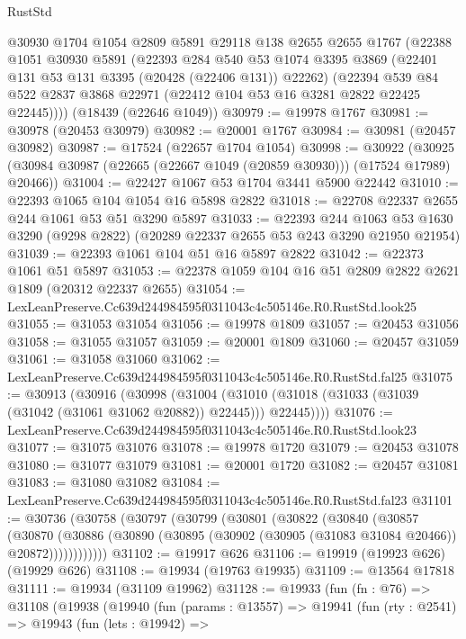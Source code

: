\begin{lexlean}{RustStd}
\begin{coremodule}
    @30930
    @1704
    @1054
    @2809
    @5891
    @29118
    @138
    @2655
    @2655
    @1767
    (@22388
      @1051
      @30930
      @5891
      (@22393
        @284
        @540
        @53
        @1074
        @3395
        @3869
        (@22401 @131 @53 @131 @3395 (@20428 (@22406 @131)) @22262)
        (@22394 @539 @84 @522 @2837 @3868 @22971 (@22412 @104 @53 @16 @3281 @2822 @22425 @22445))))
    (@18439 (@22646 @1049))
@30979 := @19978 @1767
@30981 := @30978 (@20453 @30979)
@30982 := @20001 @1767
@30984 := @30981 (@20457 @30982)
@30987 := @17524 (@22657 @1704 @1054)
@30998 := @30922
    (@30925 (@30984 @30987 (@22665 (@22667 @1049 (@20859 @30930))) (@17524 @17989) @20466))
@31004 := @22427 @1067 @53 @1704 @3441 @5900 @22442
@31010 := @22393 @1065 @104 @1054 @16 @5898 @2822
@31018 := @22708 @22337 @2655 @244 @1061 @53 @51 @3290 @5897
@31033 := @22393
    @244
    @1063
    @53
    @1630
    @3290
    (@9298 @2822)
    (@20289 @22337 @2655 @53 @243 @3290 @21950 @21954)
@31039 := @22393 @1061 @104 @51 @16 @5897 @2822
@31042 := @22373 @1061 @51 @5897
@31053 := @22378 @1059 @104 @16 @51 @2809 @2822 @2621 @1809 (@20312 @22337 @2655)
@31054 := LexLeanPreserve.Cc639d244984595f0311043c4c505146e.R0.RustStd.look25
@31055 := @31053 @31054
@31056 := @19978 @1809
@31057 := @20453 @31056
@31058 := @31055 @31057
@31059 := @20001 @1809
@31060 := @20457 @31059
@31061 := @31058 @31060
@31062 := LexLeanPreserve.Cc639d244984595f0311043c4c505146e.R0.RustStd.fal25
@31075 := @30913
    (@30916
      (@30998
        (@31004 (@31010 (@31018 (@31033 (@31039 (@31042 (@31061 @31062 @20882)) @22445))) @22445))))
@31076 := LexLeanPreserve.Cc639d244984595f0311043c4c505146e.R0.RustStd.look23
@31077 := @31075 @31076
@31078 := @19978 @1720
@31079 := @20453 @31078
@31080 := @31077 @31079
@31081 := @20001 @1720
@31082 := @20457 @31081
@31083 := @31080 @31082
@31084 := LexLeanPreserve.Cc639d244984595f0311043c4c505146e.R0.RustStd.fal23
@31101 := @30736
    (@30758
      (@30797
        (@30799
          (@30801
            (@30822
              (@30840
                (@30857
                  (@30870
                    (@30886
                      (@30890 (@30895 (@30902 (@30905 (@31083 @31084 @20466)) @20872))))))))))))
@31102 := @19917 @626
@31106 := @19919 (@19923 @626) (@19929 @626)
@31108 := @19934 (@19763 @19935)
@31109 := @13564 @17818
@31111 := @19934 (@31109 @19962)
@31128 := @19933
    (fun (fn : @76) =>
    @31108
      (@19938
        (@19940
          (fun (params : @13557) =>
          @19941
            (fun (rty : @2541) =>
            @19943
              (fun (lets : @19942) =>

\end{coremodule}
\end{lexlean}

